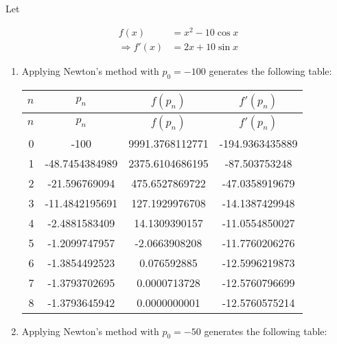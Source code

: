 \documentclass[../../../../Assignments]{subfiles}
\begin{document}
\begin{solution}
    Let

    \begin{align*}
                     f(x) &= x^2 - 10 \cos{x} \\
        \Rightarrow f'(x) &= 2x + 10 \sin{x}
    \end{align*}

    \begin{enumerate}[label = \alph*)]
        \item Applying Newton's method with \(p_0 = -100\) generates the
            following table:

            \begin{longtable}{r S[table-format=-3.10] S[table-format=4.10] S[table-format=-3.10]}
                \toprule
                \(n\)  &     {\(p_n\)}     &    {\(f(p_n)\)}   &   {\(f'(p_n)\)}   \\
                \midrule
                \endfirsthead
                \(n\)  &     {\(p_n\)}     &    {\(f(p_n)\)}   &   {\(f'(p_n)\)}   \\
                \midrule
                  &  -100             &  9991.3768112771  &  -194.9363435889  \\
                    1  &   -48.7454384989  &  2375.6104686195  &   -87.503753248   \\
                    2  &   -21.596769094   &   475.6527869722  &   -47.0358919679  \\
                    3  &   -11.4842195691  &   127.1929976708  &   -14.1387429948  \\
                    4  &    -2.4881583409  &    14.1309390157  &   -11.0554850027  \\
                    5  &    -1.2099747957  &    -2.0663908208  &   -11.7760206276  \\
                    6  &    -1.3854492523  &     0.076592885   &   -12.5996219873  \\
                    7  &    -1.3793702695  &     0.0000713728  &   -12.5760796699  \\
                    8  &    -1.3793645942  &     0.0000000001  &   -12.5760575214  \\
                \bottomrule
            \end{longtable}

        \item Applying Newton's method with \(p_0 = -50\) generates the
            following table:


\end{enumerate}
\end{solution}
\end{document}
